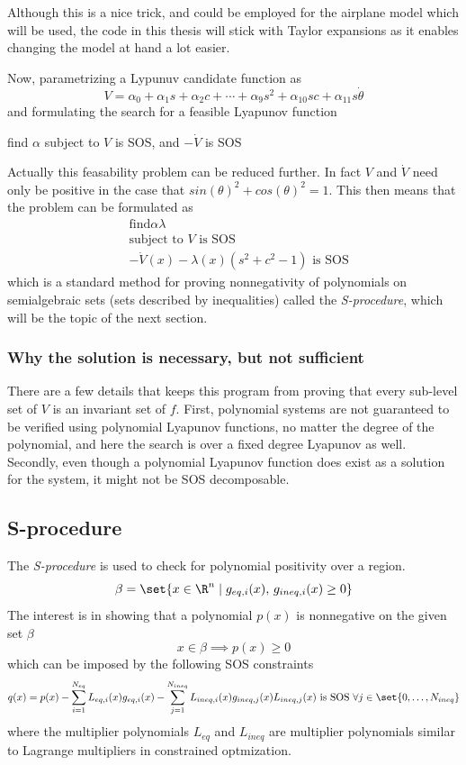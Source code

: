 Although this is a nice trick, and could be employed for the airplane model which
will be used, the code in this thesis will stick with Taylor expansions as it
enables changing the model at hand a lot easier.

Now, parametrizing a Lypunuv candidate function as
\[
  V = \alpha_0 + \alpha_1s + \alpha_2c + \cdots + \alpha_9s^2 + \alpha_{10}sc +
  \alpha_{11}s\dot{\theta}
\]
and formulating the search for a feasible Lyapunov function
\begin{example}
  find \(\alpha\) subject to \(V\) is SOS, and \(-\dot{V}\) is SOS
\end{example}

Actually this feasability problem can be reduced further. In fact \(V\) and
\(\dot{V}\) need only be positive in the case that \(sin(\theta)^2 +
cos(\theta)^2 = 1\). This then means that the problem can be formulated as
\begin{align*}
  &\text{find}\alpha \lambda \\
  &\text{subject to } V \text{ is SOS} \\
  &-\dot{V}(x) - \lambda(x)\left( s^2 + c^2 -1 \right) \text{ is SOS}
\end{align*}
which is a standard method for proving nonnegativity of polynomials on
semialgebraic sets (sets described by inequalities) called the
\textit{S-procedure}, which will be the topic of the next section.

\subsubsection{Why the solution is necessary, but not sufficient}

There are a few details that keeps this program from proving that every
sub-level set of \(V\) is an invariant set of \(f\). First, polynomial systems
are not guaranteed to be verified using polynomial Lyapunov functions, no matter
the degree of the polynomial, and here the search is over a fixed degree
Lyapunov as well. Secondly, even though a polynomial Lyapunov function does
exist as a solution for the system, it might not be \ac{SOS} decomposable.

\subsection{S-procedure}

The \textit{S-procedure} is used to check for polynomial positivity over a
region.
\[
  \beta = \set{x \in \R^n \mid g_{eq,i}(x),\,g_{ineq,i}(x) \geq 0}
\]
The interest is in showing that a polynomial \(p(x)\) is nonnegative on the
given set \(\beta\)
\[
  x \in \beta \implies p(x) \geq 0
\]
which can be imposed by the following SOS constraints
\[
  q(x) = p(x) - \sum_{i=1}^{N_{eq}}L_{eq,i}(x)g_{eq,i}(x) -
  \sum_{j=1}^{N_{ineq}}L_{ineq,i}(x)g_{ineq,j}(x) \\
  L_{ineq,j}(x) \text{ is SOS } \forall j \in \set{0,\ldots,N_{ineq}}
\]
where the multiplier polynomials \(L_{eq}\) and \(L_{ineq}\) are multiplier
polynomials similar to Lagrange multipliers in constrained optmization.

